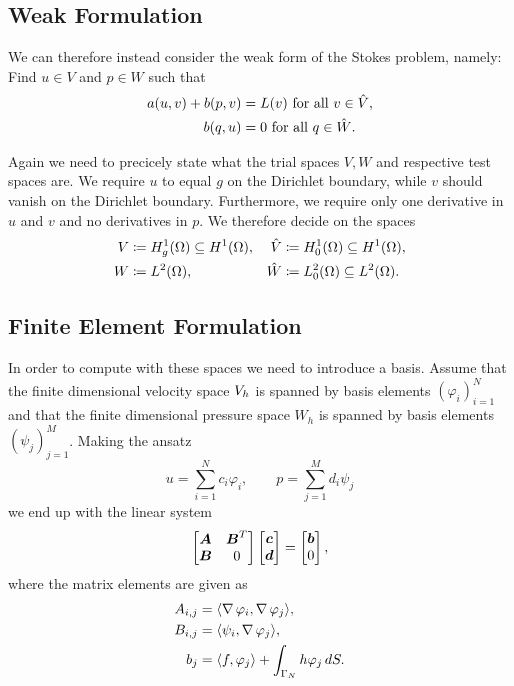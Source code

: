 \subsection{Weak Formulation}

We can therefore instead consider the weak form of the Stokes problem, namely:
Find \( u \in V \) and \( p \in W \) such that 
\begin{align}
    \label{eq:stokes_variational}
    a(u, v) + b(p, v) &= L(v) \text{ for all } v \in \hat{V},\\
    b(q, u) &= 0 \text{ for all } q \in \hat{W}.
\end{align}

Again we need to precicely state what the trial spaces \( V, W \) and
respective test spaces are. We require \( u \) to equal \( g \) on the
Dirichlet boundary, while \( v \) should vanish on the Dirichlet boundary.
Furthermore, we require only one derivative in \( u \) and \( v \) and no
derivatives in \( p \). We therefore decide on the spaces
\begin{align}
    V &\coloneqq H^1_g(\Omega) \subseteq H^1 (\Omega), & \hat{V} &\coloneqq
    H^1_0(\Omega) \subseteq H^1(\Omega), \\ 
    W &\coloneqq L^2(\Omega), & \hat{W} &\coloneqq L^2_0(\Omega) \subseteq
    L^2(\Omega).
\end{align}

\subsection{Finite Element Formulation}

In order to compute with these spaces we need to introduce a basis. Assume that
the finite dimensional velocity space \( V_h \) is spanned by basis
elements \((\varphi_i)_{i=1}^N \) and that the finite dimensional pressure
space \( W_h \) is spanned by basis elements \((\psi_j)_{j=1}^M\).  Making the
ansatz
\begin{equation}
    u = \sum^{N}_{i=1} c_i \varphi_i, \qquad p = \sum^{M}_{j=1} d_i \psi_j
\end{equation}
we end up with the linear system 
\begin{equation}
    \label{eq:discretized_stokes}
    \begin{bmatrix}
        \boldsymbol{A} & \boldsymbol{B}^T \\
        \boldsymbol{B} & 0
    \end{bmatrix} \begin{bmatrix}
        \boldsymbol{c} \\
        \boldsymbol{d}
    \end{bmatrix}
    =
    \begin{bmatrix}
        \boldsymbol{b} \\
        0
    \end{bmatrix},
\end{equation}
where the matrix elements are given as
\begin{align}
    A_{i, j} &= \langle \operatorname{\mathop{}\!\nabla} \varphi_i, \operatorname{\mathop{}\!\nabla} \varphi_j \rangle, \\
    B_{i, j} &= \langle \psi_i, \operatorname{\mathop{}\!\nabla} \varphi_j \rangle, \\
    b_j &= \langle f, \varphi_j \rangle + \int_{\Gamma_N} h \varphi_j \, dS.
\end{align}

